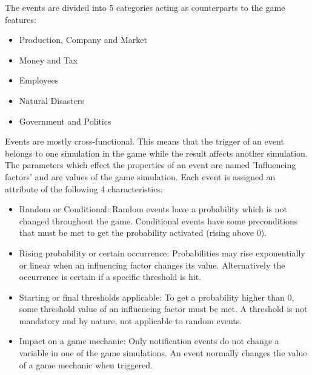 \documentclass[11pt,titlepage,oneside,openany]{book}
\begin{document}
The events are divided into 5 categories acting as counterparts to the game features:
\begin{itemize}
\item Production, Company and Market
\item Money and Tax
\item Employees
\item Natural Disasters
\item Government and Politics
\end{itemize}

Events are mostly cross-functional. This means that the trigger of an event belongs to one simulation in the game while the result affects another simulation. The parameters which effect the properties of an event are named 'Influencing factors' and are values of the game simulation. Each event is assigned an attribute of the following 4 characteristics:

\begin{itemize}
\item Random or Conditional: Random events have a probability which is not changed throughout the game. Conditional events have some preconditions that must be met to get the probability activated (rising above 0).
\item Rising probability or certain occurrence: Probabilities may rise exponentially or linear when an influencing factor changes its value. Alternatively the occurrence is certain if a specific threshold is hit.
\item Starting or final thresholds applicable: To get a probability higher than 0, some threshold value of an influencing factor must be met. A threshold is not mandatory and by nature, not applicable to random events.
\item Impact on a game mechanic: Only notification events do not change a variable in one of the game simulations. An event normally changes the value of a game mechanic when triggered.
\end{itemize}
\end{document}
